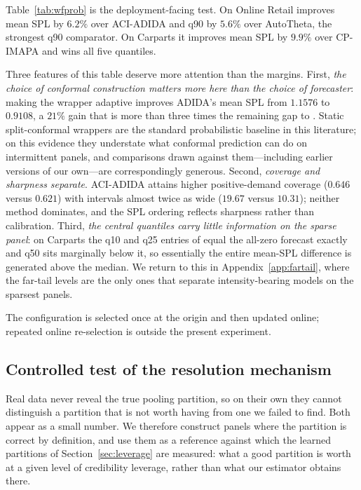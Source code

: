 Table~\ref{tab:wfprob} is the deployment-facing test. On Online Retail
\REMIX{} improves mean SPL by $6.2\%$ over ACI-ADIDA and q90 by $5.6\%$
over AutoTheta, the strongest q90 comparator. On Carparts it improves mean
SPL by $9.9\%$ over CP-IMAPA and wins all five quantiles.

Three features of this table deserve more attention than the margins.
First, \emph{the choice of conformal construction matters more here than
the choice of forecaster}: making the wrapper adaptive
\citep{gibbs2021} improves ADIDA's mean SPL from $1.1576$ to $0.9108$, a
$21\%$ gain that is more than three times the remaining gap to \REMIX{}.
Static split-conformal wrappers are the standard probabilistic baseline in
this literature; on this evidence they understate what conformal
prediction can do on intermittent panels, and comparisons drawn against
them---including earlier versions of our own---are correspondingly
generous. Second, \emph{coverage and sharpness separate}. ACI-ADIDA
attains higher positive-demand coverage ($0.646$ versus $0.621$) with
intervals almost twice as wide ($19.67$ versus $10.31$); neither method
dominates, and the SPL ordering reflects sharpness rather than
calibration. Third, \emph{the central quantiles carry little information
on the sparse panel}: on Carparts the q10 and q25 entries of \REMIX{}
equal the all-zero forecast exactly and q50 sits marginally below it, so
essentially the entire mean-SPL difference is generated above the median.
We return to this in Appendix~\ref{app:fartail}, where the far-tail
levels are the only ones that separate intensity-bearing models on the
sparsest panels.

The configuration is selected once at the origin and then updated online;
repeated online re-selection is outside the present experiment.

\subsection{Controlled test of the resolution mechanism}
\label{sec:synthetic}

Real data never reveal the true pooling partition, so on their own they
cannot distinguish a partition that is not worth having from one we failed
to find. Both appear as a small number. We therefore construct panels
where the partition is correct by definition, and use them as a reference
against which the learned partitions of Section~\ref{sec:leverage} are
measured: what a good partition is worth at a given level of credibility
leverage, rather than what our estimator obtains there.

